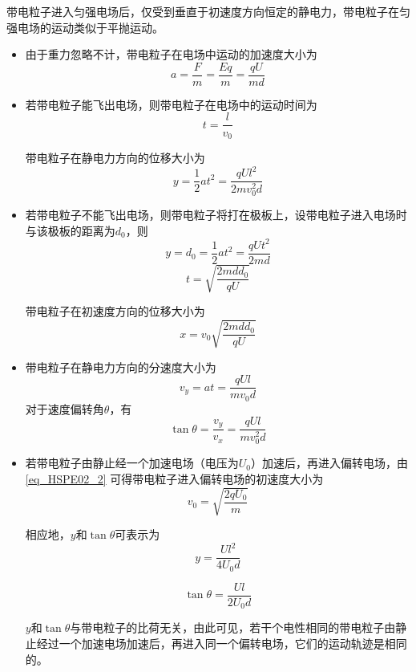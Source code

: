 带电粒子进入匀强电场后，仅受到垂直于初速度方向恒定的静电力，带电粒子在匀强电场的运动类似于平抛运动。

\begin{itemize}
\item 由于重力忽略不计，带电粒子在电场中运动的加速度大小为
\begin{equation}
a = \frac{F}{m} = \frac{Eq}{m} = \frac{qU}{md}
\end{equation}

\item 若带电粒子能飞出电场，则带电粒子在电场中的运动时间为
\begin{equation}
t = \frac{l}{v_0}
\end{equation}

带电粒子在静电力方向的位移大小为
\begin{equation}
y = \frac12 at^2 = \frac{qUl^2}{2mv_0^2 d}
\end{equation}

\item 若带电粒子不能飞出电场，则带电粒子将打在极板上，设带电粒子进入电场时与该极板的距离为$d_0$，则
\begin{equation}
y = d_0 = \frac12 at^2 = \frac{qUt^2}{2md}
\end{equation}
\begin{equation}
t = \sqrt{\frac{2mdd_0}{qU}}
\end{equation}

带电粒子在初速度方向的位移大小为
\begin{equation}
x = v_0\sqrt{\frac{2mdd_0}{qU}}
\end{equation}

\item 带电粒子在静电力方向的分速度大小为
\begin{equation}
v_y = at = \frac{qUl}{mv_0d}
\end{equation}
对于速度偏转角$\theta$，有
\begin{equation}
\tan \theta = \frac{v_y}{v_x} = \frac{qUl}{mv_0^2 d}
\end{equation}

\item 若带电粒子由静止经一个加速电场（电压为$U_0$）加速后，再进入偏转电场，由\autoref{eq_HSPE02_2} 可得带电粒子进入偏转电场的初速度大小为
\begin{equation}
v_0 = \sqrt{\frac{2qU_0}{m}}
\end{equation}

相应地，$y$和$\tan\theta$可表示为
\begin{equation}
y = \frac{Ul^2}{4U_0d}
\end{equation}

\begin{equation}
\tan\theta = \frac{Ul}{2U_0d}
\end{equation}

$y$和$\tan\theta$与带电粒子的比荷无关，由此可见，若干个电性相同的带电粒子由静止经过一个加速电场加速后，再进入同一个偏转电场，它们的运动轨迹是相同的。
\end{itemize}

